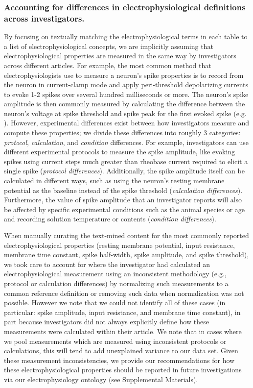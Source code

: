 \documentclass{template/frontiersSCNS} %
\begin{document}
\subsubsection{Accounting for differences in electrophysiological definitions across investigators.}
By focusing on textually matching the electrophysiological terms in each table to a list of electrophysiological concepts, we are implicitly assuming that electrophysiological properties are measured in the same way by investigators across different articles.  
For example, the most common method that electrophysiologists use to measure a neuron's spike properties is to record from the neuron in current-clamp mode and apply peri-threshold depolarizing currents to evoke 1-2 spikes over several hundred milliseconds or more.  
The neuron's spike amplitude is then commonly measured by calculating the difference between the neuron's voltage at spike threshold and spike peak for the first evoked spike (e.g. \citep{connors_electrophysiological_1982,toledo-rodriguez_correlation_2004}).  
However, experimental differences exist between how investigators measure and compute these properties; 
we divide these differences into roughly 3 categories: \textit{protocol}, \textit{calculation}, and \textit{condition} differences.  
For example, investigators can use different experimental protocols to measure the spike amplitude, like evoking spikes using current steps much greater than rheobase current required to elicit a single spike (\textit{protocol differences}).  
Additionally, the spike amplitude itself can be calculated in different ways, such as using the neuron's resting membrane potential as the baseline instead of the spike threshold (\textit{calculation differences}).  
Furthermore, the value of spike amplitude that an investigator reports will also be affected by specific experimental conditions such as the animal species or age and recording solution temperature or contents (\textit{condition differences}).

When manually curating the text-mined content for the most commonly reported electrophysiological properties (resting membrane potential, input resistance, membrane time constant, spike half-width, spike amplitude, and spike threshold), we took care to account for where the investigator had calculated an electrophysiological measurement using an inconsistent methodology (e.g., protocol or calculation differences) by normalizing such measurements to a common reference definition or removing such data when normalization was not possible.
However we note that we could not identify all of these cases (in particular: spike amplitude, input resistance, and membrane time constant), in part because investigators did not always explicitly define how these measurements were calculated within their article.  
We note that in cases where we pool measurements which are measured using inconsistent protocols or calculations, this will tend to add unexplained variance to our data set.  
Given these measurement inconsistencies, we provide our recommendations for how these electrophysiological properties should be reported in future investigations via our electrophysiology ontology (see Supplemental Materials).  
\end{document}
